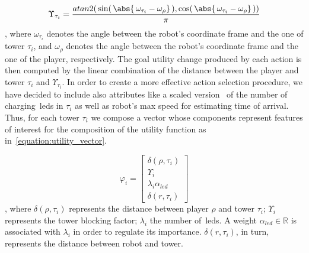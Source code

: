 \begin{equation}\label{equation:utility_function}
\Upsilon_{\tau_{i}} = \frac{atan2(\,
\sin(\,\abs{\, \omega_{\tau_{i}}-\omega_{\rho}}\,),
\cos(\,\abs{\,\omega_{\tau_{i}}-\omega_{\rho}}\,))}{\pi}
\end{equation}
, where $\omega_{\tau_{i}}$ denotes the angle between the robot's coordinate frame and the one of tower $\tau_{i}$, and $\omega_{\rho}$ denotes the angle between the robot's coordinate frame and the one of the player, respectively. The goal utility change produced by each action is then computed by the linear combination of the distance between the player and tower $\tau_{i}$ and $\Upsilon_{\tau_{i}}$. In order to create a more effective action selection procedure, we have decided to include also attributes like a scaled version
~of the number of charging~\gls{led}s in $\tau_{i}$ as well as robot's max speed for estimating time of arrival. Thus, for each tower $\tau_{i}$ we compose a vector whose components represent features of interest for the composition of the utility function as in~\ref{equation:utility_vector}.
 
\begin{equation}\label{equation:utility_vector}
\varphi_{i} = 
\begin{bmatrix}
    \delta(\rho,\tau_{i}) \\
    \Upsilon_{i}\\
    \lambda_{i}\alpha_{led}\\
    \delta(r,\tau_{i})
\end{bmatrix}
\end{equation}
, where $\delta(\rho,\tau_{i})$ represents the distance between player $\rho$ and tower $\tau_{i}$; $\Upsilon_{i}$ represents the tower blocking factor; $\lambda_{i}$ the number of~\gls{led}s. A weight $\alpha_{led} \in \mathbb{R}$ is associated with $\lambda_{i}$ in order to regulate its importance.
$\delta(r,\tau_{i})$, in turn, represents the distance between robot and tower.

